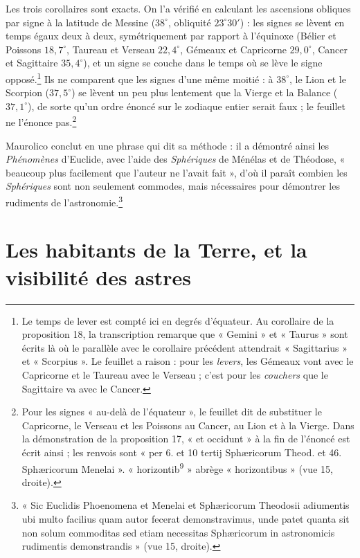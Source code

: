 \documentclass[11pt,a4paper]{article}
\begin{document}
Les trois corollaires sont exacts. On l'a vérifié en calculant les ascensions
obliques par signe à la latitude de Messine ($38^\circ$, obliquité
$23^\circ 30'$) : les signes se lèvent en temps égaux deux à deux, symétriquement
par rapport à l'équinoxe (Bélier et Poissons $18{,}7^\circ$, Taureau et Verseau
$22{,}4^\circ$, Gémeaux et Capricorne $29{,}0^\circ$, Cancer et Sagittaire
$35{,}4^\circ$), et un signe se couche dans le temps où se lève le signe
opposé.\footnote{Le temps de lever est compté ici en degrés d'équateur. Au
corollaire de la proposition 18, la transcription remarque que « Gemini » et
« Taurus » sont écrits là où le parallèle avec le corollaire précédent
attendrait « Sagittarius » et « Scorpius ». Le feuillet a raison : pour les
\emph{levers}, les Gémeaux vont avec le Capricorne et le Taureau avec le Verseau ;
c'est pour les \emph{couchers} que le Sagittaire va avec le Cancer.} Ils ne
comparent que les signes d'une même moitié : à $38^\circ$, le Lion et le Scorpion
($37{,}5^\circ$) se lèvent un peu plus lentement que la Vierge et la Balance
($37{,}1^\circ$), de sorte qu'un ordre énoncé sur le zodiaque entier serait
faux ; le feuillet ne l'énonce pas.\footnote{Pour les signes « au-delà de
l'équateur », le feuillet dit de substituer le Capricorne, le Verseau et les
Poissons au Cancer, au Lion et à la Vierge. Dans la démonstration de la
proposition 17, « et occidunt » à la fin de l'énoncé est écrit ainsi ; les
renvois sont « per 6. et 10 tertij Sphæricorum Theod. et 46. Sphæricorum
Menelai ». « horizontib\textsuperscript{9} » abrège « horizontibus » (vue 15,
droite).}

Maurolico conclut en une phrase qui dit sa méthode : il a démontré ainsi les
\emph{Phénomènes} d'Euclide, avec l'aide des \emph{Sphériques} de Ménélas et de
Théodose, « beaucoup plus facilement que l'auteur ne l'avait fait », d'où il
paraît combien les \emph{Sphériques} sont non seulement commodes, mais
nécessaires pour démontrer les rudiments de l'astronomie.\footnote{« Sic
Euclidis Phoenomena et Menelai et Sphæricorum Theodosii adiumentis ubi multo
facilius quam autor fecerat demonstravimus, unde patet quanta sit non solum
commoditas sed etiam necessitas Sphæricorum in astronomicis rudimentis
demonstrandis » (vue 15, droite).}

\section*{Les habitants de la Terre, et la visibilité des astres}
\end{document}
